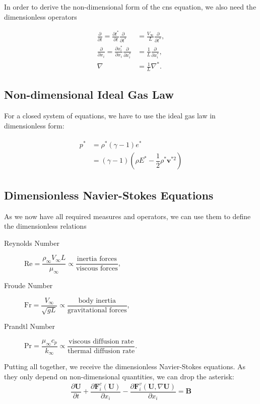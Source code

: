 	In order to derive the non-dimensional form of the \gls{cns} equation, we also need the dimensionless operators
	
	\begin{align}
		\frac{\partial}{\partial t}= \frac{\partial t^*}{\partial t} \frac{\partial}{\partial t^*} &= \frac{V_\infty}{L} \frac{\partial}{\partial t^*}, \\
		\frac{\partial}{\partial x_i} = \frac{\partial x_i^*}{\partial x_i} \frac{\partial}{\partial x_i^*} &= \frac{1}{L} \frac{\partial}{\partial x_i^*}, \\
		\nabla &= \frac{1}{L} \nabla^*.
	\end{align}
	
		
	\subsection{Non-dimensional Ideal Gas Law}
	For a closed system of equations, we have to use the ideal gas law in dimensionless form: 

	\begin{gather}	
		\begin{aligned}
			p^* &= \rho^* (\gamma - 1) e^* \\ 
			&= (\gamma - 1) \left(\rho E^* - \dfrac{1}{2} \rho^* \mathbf{v}^{*2}\right) 
		\end{aligned}
	\end{gather}
	\subsection{Dimensionless Navier-Stokes Equations}
	As we now have all required measures and operators, we can use them to define the dimensionless relations 
	\begin{description}
		\item[Reynolds Number] $\text{Re} = \dfrac{\rho_\infty V_\infty L}{\mu_\infty} \propto \dfrac{\text{inertia forces}}{\text{viscous forces}}$,
		\item[Froude Number] \quad $\text{Fr} = \dfrac{V_\infty }{\sqrt{g L}} \propto \dfrac{\text{body inertia}}{\text{gravitational forces}}$,
		\item[Prandtl Number]\quad $\text{Pr} = \dfrac{ \mu_\infty c_p}{k_\infty} \propto \dfrac{\text{viscous diffusion rate}}{\text{thermal diffusion rate}}$.
	\end{description}
	Putting all together, we receive the dimensionless Navier-Stokes equations. As they only depend on non-dimensional quantities, we can drop the asterisk:
	\begin{align}
		\dfrac{\partial \mathbf{U}}{\partial t} + \dfrac{\partial \mathbf{F}_i^c(\mathbf{U})}{\partial x_i} - \dfrac{\partial \mathbf{F}_i^v(\mathbf{U}, \nabla\mathbf{U})}{\partial x_i} = \mathbf{B}
	\end{align}
	
